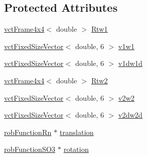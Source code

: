 \subsection*{Protected Attributes}
\begin{DoxyCompactItemize}
\item 
\hyperlink{classvct_frame4x4}{vct\-Frame4x4}$<$ double $>$ \hyperlink{classrob_function_s_e3_a16c18215d20446f2bd11e7f54ace81a6}{Rtw1}
\item 
\hyperlink{classvct_fixed_size_vector}{vct\-Fixed\-Size\-Vector}$<$ double, 6 $>$ \hyperlink{classrob_function_s_e3_a7b1d1ec3899e5c1f95c90fa2b3834e6e}{v1w1}
\item 
\hyperlink{classvct_fixed_size_vector}{vct\-Fixed\-Size\-Vector}$<$ double, 6 $>$ \hyperlink{classrob_function_s_e3_a0293adc3a9e5b8bd7f24dded9a70071a}{v1dw1d}
\item 
\hyperlink{classvct_frame4x4}{vct\-Frame4x4}$<$ double $>$ \hyperlink{classrob_function_s_e3_a06d362ebf89c4f6a3984c4097a810a27}{Rtw2}
\item 
\hyperlink{classvct_fixed_size_vector}{vct\-Fixed\-Size\-Vector}$<$ double, 6 $>$ \hyperlink{classrob_function_s_e3_a9e6845bf899f02dcab9dc56d59923787}{v2w2}
\item 
\hyperlink{classvct_fixed_size_vector}{vct\-Fixed\-Size\-Vector}$<$ double, 6 $>$ \hyperlink{classrob_function_s_e3_ab91a09514cf4b5f4b2626ed8e44133c0}{v2dw2d}
\item 
\hyperlink{classrob_function_rn}{rob\-Function\-Rn} $\ast$ \hyperlink{classrob_function_s_e3_ac5587f63170ae0ab6140d69980cc1a5b}{translation}
\item 
\hyperlink{classrob_function_s_o3}{rob\-Function\-S\-O3} $\ast$ \hyperlink{classrob_function_s_e3_a16980a975965f518020047e14a80bac3}{rotation}
\end{DoxyCompactItemize}


